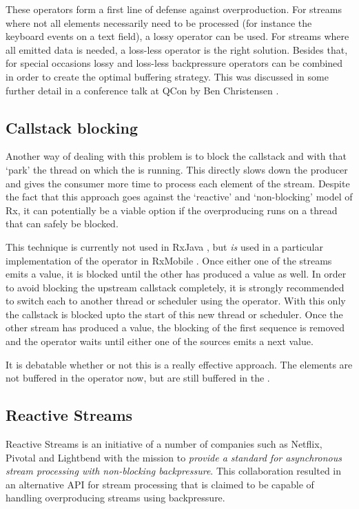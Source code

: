 These operators form a first line of defense against overproduction. For streams where not all elements necessarily need to be processed (for instance the keyboard events on a text field), a lossy operator can be used. For streams where all emitted data is needed, a loss-less operator is the right solution. Besides that, for special occasions lossy and loss-less backpressure operators can be combined in order to create the optimal buffering strategy. This was discussed in some further detail in a conference talk at QCon by Ben Christensen \cite{christensen2014-RxServiceArchitecture}.

\subsection{Callstack blocking}
\label{subsec:callstack-blocking}
Another way of dealing with this problem is to block the callstack and with that `park' the thread on which the \obs is running. This directly slows down the producer and gives the consumer more time to process each element of the stream. Despite the fact that this approach goes against the `reactive' and `non-blocking' model of Rx, it can potentially be a viable option if the overproducing \obs runs on a thread that can safely be blocked.

This technique is currently not used in RxJava \cite{RxJava-Wiki-Callstack-Blocking}, but \emph{is} used in a particular implementation of the  operator in RxMobile \cite{RxMobile}. Once either one of the streams emits a value, it is blocked until the other \obs has produced a value as well. In order to avoid blocking the upstream callstack completely, it is strongly recommended to switch each \obs to another thread or scheduler using the  operator. With this only the callstack is blocked upto the start of this new thread or scheduler. Once the other stream has produced a value, the blocking of the first \obs sequence is removed and the  operator waits until either one of the sources emits a next value.

It is debatable whether or not this is a really effective approach. The elements are not buffered in the  operator now, but are still buffered in the .

\subsection{Reactive Streams}
\label{subsec:reactive-streams}
Reactive Streams is an initiative \cite{Reactive-Streams} of a number of companies such as Netflix, Pivotal and Lightbend with the mission to \textit{provide a standard for asynchronous stream processing with non-blocking backpressure}. This collaboration resulted in an alternative API \cite{Reactive-Streams-API} for stream processing that is claimed to be capable of handling overproducing streams using backpressure.

